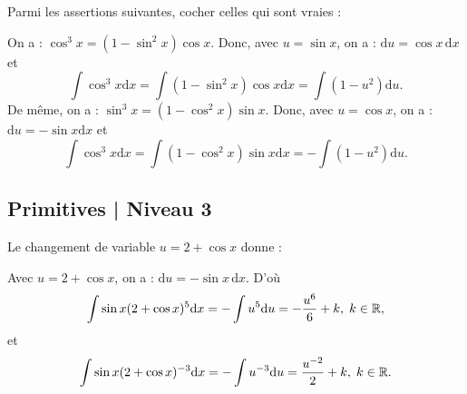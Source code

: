 \begin{question}
Parmi les assertions suivantes, cocher celles qui sont vraies :
\begin{answers}  
\end{answers}
\begin{explanations}
On a : $\cos ^3x=(1-\sin ^2x)\cos x$. Donc, avec $u=\sin x$, on a : $\mathrm{d}u=\cos x\, \mathrm{d}x$ et
$$\int \cos ^3x\mathrm{d}x=\int (1-\sin ^2x)\cos x\mathrm{d}x=\int (1-u^2)\mathrm{d}u.$$
De m\^eme, on a : $\sin ^3x=(1-\cos ^2x)\sin x$. Donc, avec $u=\cos x$, on a : $\mathrm{d}u=-\sin x\mathrm{d}x$ et
$$\int \cos ^3x\mathrm{d}x=\int (1-\cos ^2x)\sin x\mathrm{d}x=-\int (1-u^2)\mathrm{d}u.$$
\end{explanations}
\end{question}

\subsection{Primitives | Niveau 3}

\begin{question}
Le changement de variable $u=2+\cos x$ donne :
\begin{answers}  
\end{answers}
\begin{explanations}
Avec $u=2+\cos x$, on a : $\mathrm{d}u=-\sin x\, \mathrm{d}x$. D'où
$$\int \sin x(2+\cos x)^5\mathrm{d}x=-\int u^5\mathrm{d}u=-\frac{u^6}{6}+k,\; k\in \mathbb{R},$$
et
$$\int \sin x(2+\cos x)^{-3}\mathrm{d}x=-\int u^{-3}\mathrm{d}u=\frac{u^{-2}}{2}+k,\; k\in \mathbb{R}.$$
\end{explanations}
\end{question}

